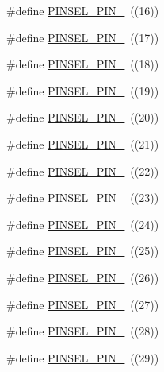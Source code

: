 \begin{DoxyCompactItemize}
\item 
\#define \hyperlink{group___p_i_n_s_e_l___public___macros_ga7f7070e9cf520a08cbdd2daa09e90022}{\-P\-I\-N\-S\-E\-L\-\_\-\-P\-I\-N\-\_}~((16))
\item 
\#define \hyperlink{group___p_i_n_s_e_l___public___macros_ga1b43687db040e5b4d7e4d6ba6cac0e83}{\-P\-I\-N\-S\-E\-L\-\_\-\-P\-I\-N\-\_}~((17))
\item 
\#define \hyperlink{group___p_i_n_s_e_l___public___macros_ga6203e5b5f1e3a49fa2fc1ca61f6fde52}{\-P\-I\-N\-S\-E\-L\-\_\-\-P\-I\-N\-\_}~((18))
\item 
\#define \hyperlink{group___p_i_n_s_e_l___public___macros_ga2b68a8639e7133664f1ebf2ef222eca0}{\-P\-I\-N\-S\-E\-L\-\_\-\-P\-I\-N\-\_}~((19))
\item 
\#define \hyperlink{group___p_i_n_s_e_l___public___macros_gaf6f10e74df1a1bbcb6ef73ba610cc129}{\-P\-I\-N\-S\-E\-L\-\_\-\-P\-I\-N\-\_}~((20))
\item 
\#define \hyperlink{group___p_i_n_s_e_l___public___macros_ga1708e4ff4379303c85280efcbcfeeacf}{\-P\-I\-N\-S\-E\-L\-\_\-\-P\-I\-N\-\_}~((21))
\item 
\#define \hyperlink{group___p_i_n_s_e_l___public___macros_ga27e3f393b4659a93c8f4d3b3b3a07895}{\-P\-I\-N\-S\-E\-L\-\_\-\-P\-I\-N\-\_}~((22))
\item 
\#define \hyperlink{group___p_i_n_s_e_l___public___macros_ga0bf6017400b515d5384cc6c9b2616dfb}{\-P\-I\-N\-S\-E\-L\-\_\-\-P\-I\-N\-\_}~((23))
\item 
\#define \hyperlink{group___p_i_n_s_e_l___public___macros_ga59268564226c0dec33b412a4cd60652e}{\-P\-I\-N\-S\-E\-L\-\_\-\-P\-I\-N\-\_}~((24))
\item 
\#define \hyperlink{group___p_i_n_s_e_l___public___macros_ga7c717ad27b00320f904d2b43044ba715}{\-P\-I\-N\-S\-E\-L\-\_\-\-P\-I\-N\-\_}~((25))
\item 
\#define \hyperlink{group___p_i_n_s_e_l___public___macros_ga34dc530d30abfe96758b94606849361f}{\-P\-I\-N\-S\-E\-L\-\_\-\-P\-I\-N\-\_}~((26))
\item 
\#define \hyperlink{group___p_i_n_s_e_l___public___macros_gaed7e80ef29cd5027ef7794d78861dc12}{\-P\-I\-N\-S\-E\-L\-\_\-\-P\-I\-N\-\_}~((27))
\item 
\#define \hyperlink{group___p_i_n_s_e_l___public___macros_gaa2f94e6ccf0aafdc16627745d98678e3}{\-P\-I\-N\-S\-E\-L\-\_\-\-P\-I\-N\-\_}~((28))
\item 
\#define \hyperlink{group___p_i_n_s_e_l___public___macros_gae2117d5933ea9ffd03005dcedaa8ffcd}{\-P\-I\-N\-S\-E\-L\-\_\-\-P\-I\-N\-\_}~((29))

\end{DoxyCompactItemize}
